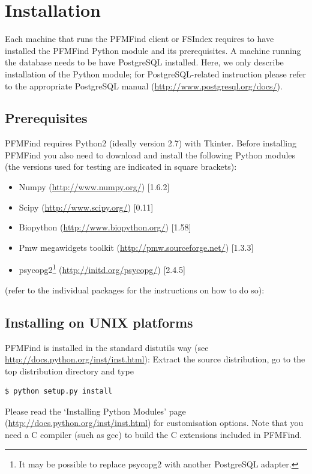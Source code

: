 \documentclass[10pt,letter]{article}
\begin{document}
\section{Installation}

Each machine that runs the PFMFind client or FSIndex requires to have installed the PFMFind Python module and its prerequisites. A machine running the database needs to be have PostgreSQL installed. Here, we only describe installation of the Python module; for PostgreSQL-related instruction please refer to the appropriate PostgreSQL manual (\url{http://www.postgresql.org/docs/}).

\subsection{Prerequisites}
PFMFind requires Python2 (ideally version 2.7) with Tkinter. Before installing PFMFind you also need to download and install the following Python modules (the versions used for testing are indicated in square brackets):

\begin{itemize}
\item Numpy (\url{http://www.numpy.org/}) [1.6.2]
\item Scipy (\url{http://www.scipy.org/}) [0.11]
\item Biopython (\url{http://www.biopython.org/}) [1.58]
\item Pmw megawidgets toolkit (\url{http://pmw.sourceforge.net/}) [1.3.3]
\item psycopg2\footnote{It may be possible to replace psycopg2 with another PostgreSQL adapter.} (\url{http://initd.org/psycopg/}) [2.4.5]
\end{itemize}

(refer to the individual packages for the instructions on how to do so):

\subsection{Installing on UNIX platforms}

PFMFind is installed in the standard distutils way (see \url{http://docs.python.org/inst/inst.html}): Extract the source distribution, go to the top distribution directory and type
\begin{verbatim}
$ python setup.py install
\end{verbatim}
Please read the `Installing Python Modules' page (\url{http://docs.python.org/inst/inst.html}) for
customisation options. Note that you need a C compiler (such as gcc) to build the C extensions included in PFMFind.
\end{document}
